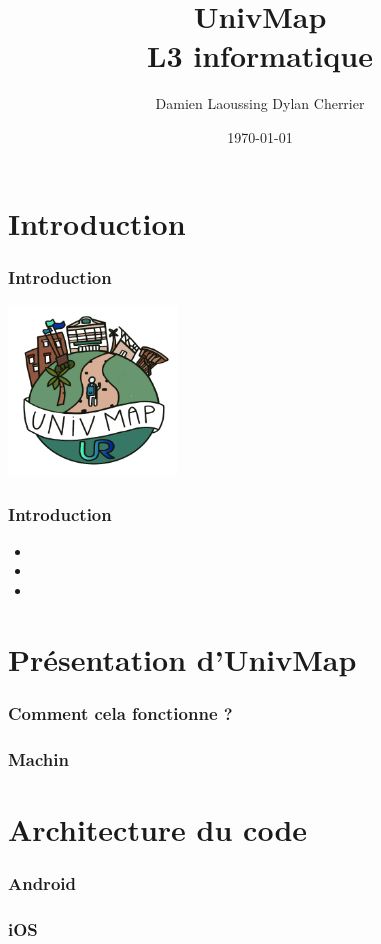 \documentclass{beamer}
\title[Dev. Mobiles -- L3 info]{UnivMap\\L3 informatique}
\author{Damien Laoussing Dylan Cherrier}
\institute[DI]{Département d'informatique}
\date{\today}
\begin{document}
\begin{frame}
  \titlepage
\end{frame}


\section{Introduction}
%
%
\begin{frame}
  \frametitle{Introduction}
  \begin{center}
    \includegraphics[width=45mm, scale=0.5]{UnivMap-logo500x500.png}
  \end{center}
  
\end{frame}
%
%
\begin{frame}
  \frametitle{Introduction}
  \begin{itemize}
    \item 
    \item
    \item
  \end{itemize}
\end{frame}
%
%
\section{Présentation d'UnivMap}
%
%
\begin{frame}
  \frametitle{Comment cela fonctionne ?}
\end{frame}
%
%
\begin{frame}
  \frametitle{Machin}
\end{frame}
%
%
\section{Architecture du code}
%
%
\begin{frame}
  \frametitle{Android}
\end{frame}
%
%
\begin{frame}
  \frametitle{iOS}
\end{frame}
%
%
\end{document}
